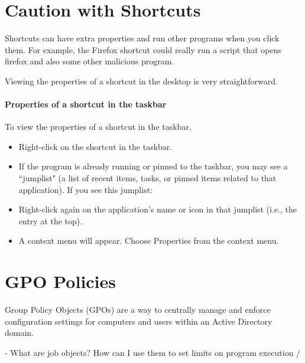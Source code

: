 \documentclass{article}
\begin{document}
\section{Caution with Shortcuts}
Shortcuts can have extra properties and run other programs when you click them.
For example, the Firefox shortcut could really run a script that opens firefox and also some
other malicious program.

\noindent Viewing the properties of a shortcut in the desktop is very straightforward.

\paragraph{Properties of a shortcut in the taskbar}
To view the properties of a shortcut in the taskbar, 
\begin{itemize}
\item Right-click on the shortcut in the taskbar.
\item If the program is already running or pinned to the taskbar, you may see a ``jumplist" (a list of recent items, tasks, or pinned items related to that application). If you see this jumplist:
\item Right-click again on the application's name or icon in that jumplist (i.e., the entry at the top).
\item A context menu will appear. Choose Properties from the context menu.
\end{itemize}

\section{GPO Policies}
Group Policy Objects (GPOs) are a way to centrally manage 
and enforce configuration settings for computers 
and users within an Active Directory domain.

- What are job objects? How can I use them to set limits on program execution / 
\end{document}
